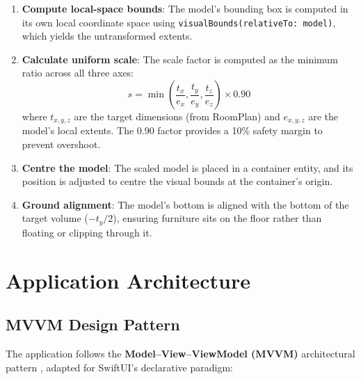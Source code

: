 \begin{enumerate}
    \item \textbf{Compute local-space bounds}: The model's bounding box is computed in its own local coordinate space using \texttt{visualBounds(relativeTo: model)}, which yields the untransformed extents.
    \item \textbf{Calculate uniform scale}: The scale factor is computed as the minimum ratio across all three axes:
    \[
        s = \min\left(\frac{t_x}{e_x}, \frac{t_y}{e_y}, \frac{t_z}{e_z}\right) \times 0.90
    \]
    where $t_{x,y,z}$ are the target dimensions (from RoomPlan) and $e_{x,y,z}$ are the model's local extents. The 0.90 factor provides a 10\% safety margin to prevent overshoot.

    \item \textbf{Centre the model}: The scaled model is placed in a container entity, and its position is adjusted to centre the visual bounds at the container's origin.

    \item \textbf{Ground alignment}: The model's bottom is aligned with the bottom of the target volume ($-t_y/2$), ensuring furniture sits on the floor rather than floating or clipping through it.
\end{enumerate}


\section{Application Architecture}
\label{sec:architecture}

\subsection{MVVM Design Pattern}

The application follows the \textbf{Model--View--ViewModel (MVVM)} architectural pattern \cite{microsoft_mvvm}, adapted for SwiftUI's declarative paradigm:

